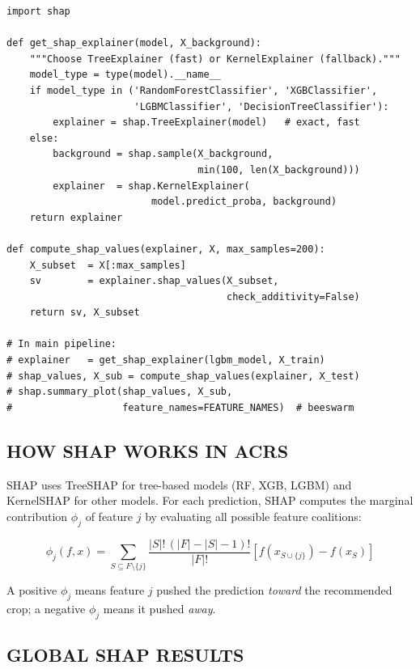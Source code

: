 \documentclass[12pt,a4paper,oneside]{report}
\begin{document}
\begin{singlespacing}
\begin{lstlisting}[caption={explainability/shap\_explainer.py --- TreeSHAP and KernelSHAP}]
import shap

def get_shap_explainer(model, X_background):
    """Choose TreeExplainer (fast) or KernelExplainer (fallback)."""
    model_type = type(model).__name__
    if model_type in ('RandomForestClassifier', 'XGBClassifier',
                      'LGBMClassifier', 'DecisionTreeClassifier'):
        explainer = shap.TreeExplainer(model)   # exact, fast
    else:
        background = shap.sample(X_background,
                                 min(100, len(X_background)))
        explainer  = shap.KernelExplainer(
                         model.predict_proba, background)
    return explainer

def compute_shap_values(explainer, X, max_samples=200):
    X_subset  = X[:max_samples]
    sv        = explainer.shap_values(X_subset,
                                      check_additivity=False)
    return sv, X_subset

# In main pipeline:
# explainer   = get_shap_explainer(lgbm_model, X_train)
# shap_values, X_sub = compute_shap_values(explainer, X_test)
# shap.summary_plot(shap_values, X_sub,
#                   feature_names=FEATURE_NAMES)  # beeswarm
\end{lstlisting}
\end{singlespacing}

\subsection{HOW SHAP WORKS IN ACRS}

SHAP uses TreeSHAP for tree-based models (RF, XGB, LGBM) and KernelSHAP for other models. For each prediction, SHAP computes the marginal contribution $\phi_j$ of feature $j$ by evaluating all possible feature coalitions:

\begin{equation}
\phi_j(f,x) = \sum_{S \subseteq F \setminus \{j\}} \frac{|S|!\,(|F|-|S|-1)!}{|F|!}
\left[ f(x_{S \cup \{j\}}) - f(x_S) \right]
\end{equation}

A positive $\phi_j$ means feature $j$ pushed the prediction \textit{toward} the recommended crop; a negative $\phi_j$ means it pushed \textit{away}.

\subsection{GLOBAL SHAP RESULTS}
\end{document}
